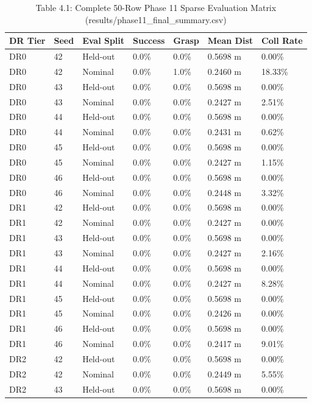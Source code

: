 \documentclass[11pt,a4paper,oneside]{book}
\begin{document}
\begin{longtable}{l l l l l l l}\caption{Table 4.1: Complete 50-Row Phase 11 Sparse Evaluation Matrix (results/phase11\_final\_summary.csv)}\\\toprule
DR Tier & Seed & Eval Split & Success & Grasp & Mean Dist & Coll Rate \\ \midrule \endhead
DR0 & 42 & Held-out & 0.0\% & 0.0\% & 0.5698 m & 0.00\% \\
DR0 & 42 & Nominal & 0.0\% & 1.0\% & 0.2460 m & 18.33\% \\
DR0 & 43 & Held-out & 0.0\% & 0.0\% & 0.5698 m & 0.00\% \\
DR0 & 43 & Nominal & 0.0\% & 0.0\% & 0.2427 m & 2.51\% \\
DR0 & 44 & Held-out & 0.0\% & 0.0\% & 0.5698 m & 0.00\% \\
DR0 & 44 & Nominal & 0.0\% & 0.0\% & 0.2431 m & 0.62\% \\
DR0 & 45 & Held-out & 0.0\% & 0.0\% & 0.5698 m & 0.00\% \\
DR0 & 45 & Nominal & 0.0\% & 0.0\% & 0.2427 m & 1.15\% \\
DR0 & 46 & Held-out & 0.0\% & 0.0\% & 0.5698 m & 0.00\% \\
DR0 & 46 & Nominal & 0.0\% & 0.0\% & 0.2448 m & 3.32\% \\
DR1 & 42 & Held-out & 0.0\% & 0.0\% & 0.5698 m & 0.00\% \\
DR1 & 42 & Nominal & 0.0\% & 0.0\% & 0.2427 m & 0.00\% \\
DR1 & 43 & Held-out & 0.0\% & 0.0\% & 0.5698 m & 0.00\% \\
DR1 & 43 & Nominal & 0.0\% & 0.0\% & 0.2427 m & 2.16\% \\
DR1 & 44 & Held-out & 0.0\% & 0.0\% & 0.5698 m & 0.00\% \\
DR1 & 44 & Nominal & 0.0\% & 0.0\% & 0.2427 m & 8.28\% \\
DR1 & 45 & Held-out & 0.0\% & 0.0\% & 0.5698 m & 0.00\% \\
DR1 & 45 & Nominal & 0.0\% & 0.0\% & 0.2426 m & 0.00\% \\
DR1 & 46 & Held-out & 0.0\% & 0.0\% & 0.5698 m & 0.00\% \\
DR1 & 46 & Nominal & 0.0\% & 0.0\% & 0.2417 m & 9.01\% \\
DR2 & 42 & Held-out & 0.0\% & 0.0\% & 0.5698 m & 0.00\% \\
DR2 & 42 & Nominal & 0.0\% & 0.0\% & 0.2449 m & 5.55\% \\
DR2 & 43 & Held-out & 0.0\% & 0.0\% & 0.5698 m & 0.00\% \\

\end{longtable}
\end{document}
